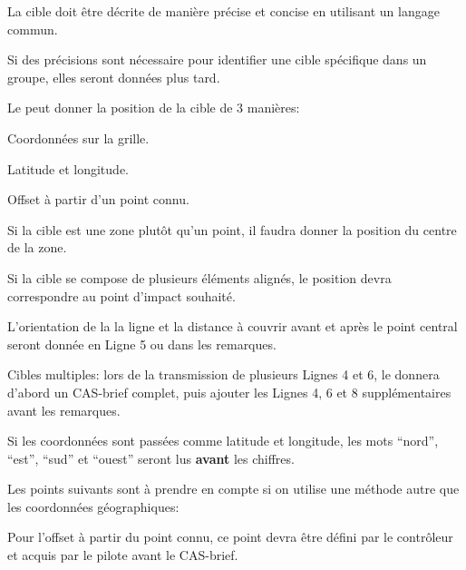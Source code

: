\begin{e1}
{		La cible doit être décrite de manière précise et concise en utilisant un langage commun.
		
		Si des précisions sont nécessaire pour identifier une cible spécifique dans un groupe, elles seront données plus tard.
	}
	
	\begin{e2}
		
		\item Le \ja{} peut donner la position de la cible de 3 manières:
		
		\begin{e3}
			
			\item Coordonnées sur la grille.
			
			\item Latitude et longitude.
			
			\item Offset à partir d'un point connu.			
			
		\end{e3}
		
		\item Si la cible est une zone plutôt qu'un point, il faudra donner la position du centre de la zone.
		
		\item Si la cible se compose de plusieurs éléments alignés, le position devra correspondre au point d'impact souhaité.
		
		L'orientation de la la ligne et la distance à couvrir avant et après le point central seront donnée en Ligne 5 ou dans les remarques.
		
		\item Cibles multiples: lors de la transmission de plusieurs Lignes 4 et 6, le \ja{} donnera d'abord un CAS-brief complet, puis ajouter les Lignes 4, 6 et 8 supplémentaires avant les remarques.
		
		\item Si les coordonnées sont passées comme latitude et longitude, les mots ``nord'', ``est'', ``sud'' et ``ouest'' seront lus \textbf{avant} les chiffres.
		
		\item Les points suivants sont à prendre en compte si on utilise une méthode autre que les coordonnées géographiques:
		
		\begin{e3}
			
			\item Pour l'offset à partir du point connu, ce point devra être défini par le contrôleur et acquis par le pilote avant le CAS-brief.
			

\end{e3}
\end{e2}
\end{e1}
